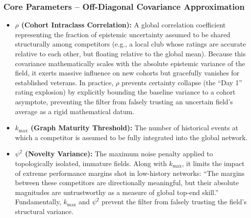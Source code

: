 \documentclass[12pt]{article}
\begin{document}
	\subsubsection*{Core Parameters -- Off-Diagonal Covariance Approximation}
	\begin{itemize}
		\item \textbf{$\rho$ (Cohort Intraclass Correlation):} A global correlation coefficient representing the fraction of epistemic uncertainty assumed to be shared structurally among competitors (e.g., a local club whose ratings are accurate relative to each other, but floating relative to the global mean). Because this covariance mathematically scales with the absolute epistemic variance of the field, it exerts massive influence on new cohorts but gracefully vanishes for established veterans. In practice, $\rho$ prevents certainty collapse (the ``Day 1'' rating explosion) by explicitly bounding the baseline variance to a cohort asymptote, preventing the filter from falsely trusting an uncertain field's average as a rigid mathematical datum.
		\item \textbf{$k_{\mathrm{max}}$ (Graph Maturity Threshold):} The number of historical events at which a competitor is assumed to be fully integrated into the global network.
		\item \textbf{$\psi^2$ (Novelty Variance):} The maximum noise penalty applied to topologically isolated, immature fields. Along with $k_{\mathrm{max}}$, it limits the impact of extreme performance margins shot in low-history networks: ``The margins between these competitors are directionally meaningful, but their absolute magnitudes are untrustworthy as a measure of global top-end skill.'' Fundamentally, $k_{\mathrm{max}}$ and $\psi^2$ prevent the filter from falsely trusting the field's structural variance.
	\end{itemize}
\end{document}
